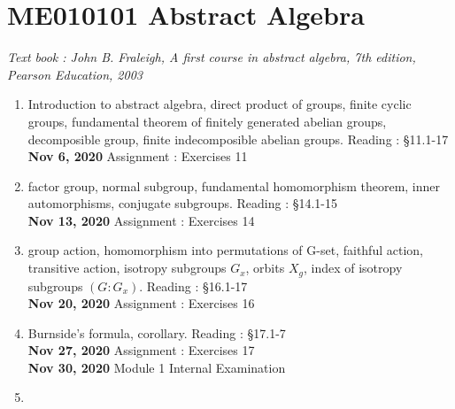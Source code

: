 
\chapter{ME010101 Abstract Algebra}
\textit{Text book : John B. Fraleigh, A first course in abstract algebra, 7th edition, Pearson Education, 2003}
\begin{enumerate}[label=Week \arabic*]
	\item Introduction to abstract algebra, direct product of groups, finite cyclic groups, fundamental theorem of finitely generated abelian groups, decomposible group, finite indecomposible abelian groups. Reading : \S 11.1-17\\
		\textbf{Nov 6, 2020} Assignment : Exercises 11
	\item factor group, normal subgroup, fundamental homomorphism theorem, inner automorphisms, conjugate subgroups. Reading : \S 14.1-15\\
		\textbf{Nov 13, 2020} Assignment : Exercises 14
	\item group action, homomorphism into permutations of G-set, faithful action, transitive action, isotropy subgroups $G_x$, orbits $X_g$, index of isotropy subgroups $(G:G_x)$. Reading : \S 16.1-17\\
		\textbf{Nov 20, 2020} Assignment : Exercises 16
	\item Burnside's formula, corollary. Reading : \S 17.1-7\\
		\textbf{Nov 27, 2020} Assignment : Exercises 17\\
		\textbf{Nov 30, 2020} Module 1 Internal Examination
	\item 
\end{enumerate}
